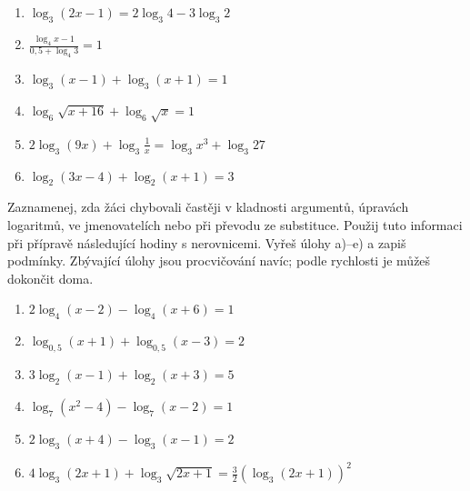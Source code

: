 \documentclass[11pt,a4paper]{article}
\begin{document}
\begin{zadaniBox}[title={Samostatná práce 1}]
\begin{enumerate}[label=\alph*)]
\item $\displaystyle \log_3(2x-1)=2\log_3 4-3\log_3 2$
\item $\displaystyle \frac{\log_4 x-1}{0{,}5+\log_4 3}=1$
\item $\displaystyle \log_3(x-1)+\log_3(x+1)=1$
\item $\displaystyle \log_6\sqrt{x+16}+\log_6\sqrt{x}=1$
\item $\displaystyle 2\log_3(9x)+\log_3\frac1x=\log_3x^3+\log_3 27$
\item $\displaystyle \log_2(3x-4)+\log_2(x+1)=3$
\end{enumerate}
\end{zadaniBox}
Zaznamenej, zda žáci chybovali častěji v kladnosti argumentů, úpravách logaritmů, ve jmenovatelích nebo při převodu ze substituce. Použij tuto informaci při přípravě následující hodiny s nerovnicemi.
Vyřeš úlohy a)--e) a zapiš podmínky. Zbývající úlohy jsou procvičování navíc; podle rychlosti je můžeš dokončit doma. 
\begin{zadaniBox}[title={Domácí úkol}]
\begin{enumerate}[label=\alph*)]
\item $\displaystyle 2\log_4(x-2)-\log_4(x+6)=1$
\item $\displaystyle \log_{0{,}5}(x+1)+\log_{0{,}5}(x-3)=2$
\item $\displaystyle 3\log_2(x-1)+\log_2(x+3)=5$
\item $\displaystyle \log_7(x^2-4)-\log_7(x-2)=1$
\item $\displaystyle 2\log_3(x+4)-\log_3(x-1)=2$
\item $\displaystyle 4\log_3(2x+1)+\log_3\sqrt{2x+1}=\frac32(\log_3(2x+1))^2$
\end{enumerate}
\end{zadaniBox}
\end{document}
